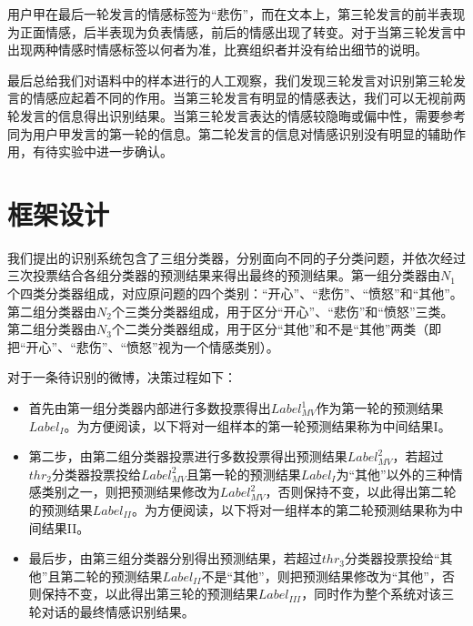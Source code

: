 用户甲在最后一轮发言的情感标签为“悲伤”，而在文本上，第三轮发言的前半表现为正面情感，后半表现为负表情感，前后的情感出现了转变。对于当第三轮发言中出现两种情感时情感标签以何者为准，比赛组织者并没有给出细节的说明。

最后总给我们对语料中的样本进行的人工观察，我们发现三轮发言对识别第三轮发言的情感应起着不同的作用。当第三轮发言有明显的情感表达，我们可以无视前两轮发言的信息得出识别结果。当第三轮发言表达的情感较隐晦或偏中性，需要参考同为用户甲发言的第一轮的信息。第二轮发言的信息对情感识别没有明显的辅助作用，有待实验中进一步确认。

\section{框架设计}
\label{sec:exp_context_emo_framework}

我们提出的识别系统包含了三组分类器，分别面向不同的子分类问题，并依次经过三次投票结合各组分类器的预测结果来得出最终的预测结果。第一组分类器由$N_1$个四类分类器组成，对应原问题的四个类别：“开心”、“悲伤”、“愤怒”和“其他”。第二组分类器由$N_2$个三类分类器组成，用于区分“开心”、“悲伤”和“愤怒”三类。第二组分类器由$N_3$个二类分类器组成，用于区分“其他”和不是“其他”两类（即把“开心”、“悲伤”、“愤怒”视为一个情感类别）。

对于一条待识别的微博，决策过程如下：

\begin{itemize}

\item 首先由第一组分类器内部进行多数投票得出$Label^{1}_{MV}$作为第一轮的预测结果$Label_{I}$。为方便阅读，以下将对一组样本的第一轮预测结果称为中间结果I。

\item 第二步，由第二组分类器投票进行多数投票得出预测结果$Label^{2}_{MV}$，若超过$thr_{2}$分类器投票投给$Label^{2}_{MV}$且第一轮的预测结果$Label_{I}$为“其他”以外的三种情感类别之一，则把预测结果修改为$Label^{2}_{MV}$，否则保持不变，以此得出第二轮的预测结果$Label_{II}$。为方便阅读，以下将对一组样本的第二轮预测结果称为中间结果II。

\item 最后步，由第三组分类器分别得出预测结果，若超过$thr_{3}$分类器投票投给“其他”且第二轮的预测结果$Label_{II}$不是“其他”，则把预测结果修改为“其他”，否则保持不变，以此得出第三轮的预测结果$Label_{III}$，同时作为整个系统对该三轮对话的最终情感识别结果。

\end{itemize}


